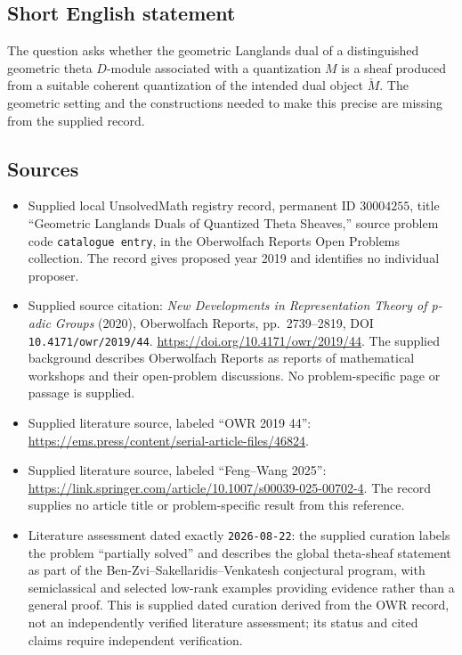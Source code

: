 \documentclass[11pt]{article}
\begin{document}
\subsection{Short English statement}
The question asks whether the geometric Langlands dual of a distinguished geometric theta \(D\)-module associated with a quantization \(M\) is a sheaf produced from a suitable coherent quantization of the intended dual object \(\check M\). The geometric setting and the constructions needed to make this precise are missing from the supplied record.
\subsection{Sources}
\begin{itemize}
\item Supplied local UnsolvedMath registry record, permanent ID \(30004255\), title ``Geometric Langlands Duals of Quantized Theta Sheaves,'' source problem code \texttt{catalogue entry}, in the Oberwolfach Reports Open Problems collection. The record gives proposed year 2019 and identifies no individual proposer.
\item Supplied source citation: \emph{New Developments in Representation Theory of p-adic Groups} (2020), Oberwolfach Reports, pp.~2739--2819, DOI \texttt{10.4171/owr/2019/44}. \url{https://doi.org/10.4171/owr/2019/44}. The supplied background describes Oberwolfach Reports as reports of mathematical workshops and their open-problem discussions. No problem-specific page or passage is supplied.
\item Supplied literature source, labeled ``OWR 2019 44'': \url{https://ems.press/content/serial-article-files/46824}.
\item Supplied literature source, labeled ``Feng--Wang 2025'': \url{https://link.springer.com/article/10.1007/s00039-025-00702-4}. The record supplies no article title or problem-specific result from this reference.
\item Literature assessment dated exactly \texttt{2026-08-22}: the supplied curation labels the problem ``partially solved'' and describes the global theta-sheaf statement as part of the Ben-Zvi--Sakellaridis--Venkatesh conjectural program, with semiclassical and selected low-rank examples providing evidence rather than a general proof. This is supplied dated curation derived from the OWR record, not an independently verified literature assessment; its status and cited claims require independent verification.
\end{itemize}
\end{document}
